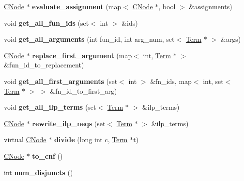 \begin{DoxyCompactItemize}
\item 
\hypertarget{classCNode_aff2111bfcd019bc2f7224d44b9482eb6}{\hyperlink{classCNode}{\-C\-Node} $\ast$ {\bfseries evaluate\-\_\-assignment} (map$<$ \hyperlink{classCNode}{\-C\-Node} $\ast$, bool $>$ \&assignments)}\label{classCNode_aff2111bfcd019bc2f7224d44b9482eb6}

\item 
\hypertarget{classCNode_a44103c28feda4d67c50b0f91160b1086}{void {\bfseries get\-\_\-all\-\_\-fun\-\_\-ids} (set$<$ int $>$ \&ids)}\label{classCNode_a44103c28feda4d67c50b0f91160b1086}

\item 
\hypertarget{classCNode_aab0f2a0f52799a112e1d99d4c175a60f}{void {\bfseries get\-\_\-all\-\_\-arguments} (int fun\-\_\-id, int arg\-\_\-num, set$<$ \hyperlink{classTerm}{\-Term} $\ast$ $>$ \&args)}\label{classCNode_aab0f2a0f52799a112e1d99d4c175a60f}

\item 
\hypertarget{classCNode_ab3e3c17251ab4a317677da0cda2ef9fa}{\hyperlink{classCNode}{\-C\-Node} $\ast$ {\bfseries replace\-\_\-first\-\_\-argument} (map$<$ int, \hyperlink{classTerm}{\-Term} $\ast$ $>$ \&fun\-\_\-id\-\_\-to\-\_\-replacement)}\label{classCNode_ab3e3c17251ab4a317677da0cda2ef9fa}

\item 
\hypertarget{classCNode_a6afbddb17f377f9d79c94eb819fcbe2a}{void {\bfseries get\-\_\-all\-\_\-first\-\_\-arguments} (set$<$ int $>$ \&fn\-\_\-ids, map$<$ int, set$<$ \hyperlink{classTerm}{\-Term} $\ast$ $>$ $>$ \&fn\-\_\-id\-\_\-to\-\_\-first\-\_\-arg)}\label{classCNode_a6afbddb17f377f9d79c94eb819fcbe2a}

\item 
\hypertarget{classCNode_a24fdd41a897f711b7bce2e7888b4ec28}{void {\bfseries get\-\_\-all\-\_\-ilp\-\_\-terms} (set$<$ \hyperlink{classTerm}{\-Term} $\ast$ $>$ \&ilp\-\_\-terms)}\label{classCNode_a24fdd41a897f711b7bce2e7888b4ec28}

\item 
\hypertarget{classCNode_a9cc7a165f14dd649110364501a58ed53}{\hyperlink{classCNode}{\-C\-Node} $\ast$ {\bfseries rewrite\-\_\-ilp\-\_\-neqs} (set$<$ \hyperlink{classTerm}{\-Term} $\ast$ $>$ \&ilp\-\_\-terms)}\label{classCNode_a9cc7a165f14dd649110364501a58ed53}

\item 
\hypertarget{classCNode_ab0cccd12453d30cc82776b52a53f75e9}{virtual \hyperlink{classCNode}{\-C\-Node} $\ast$ {\bfseries divide} (long int c, \hyperlink{classTerm}{\-Term} $\ast$t)}\label{classCNode_ab0cccd12453d30cc82776b52a53f75e9}

\item 
\hypertarget{classCNode_ab5de02af9464fdca7434f0b037bbf159}{\hyperlink{classCNode}{\-C\-Node} $\ast$ {\bfseries to\-\_\-cnf} ()}\label{classCNode_ab5de02af9464fdca7434f0b037bbf159}

\item 
\hypertarget{classCNode_a3103fd0a931004f3615ab72770ac3e58}{int {\bfseries num\-\_\-disjuncts} ()}\label{classCNode_a3103fd0a931004f3615ab72770ac3e58}

\end{DoxyCompactItemize}
